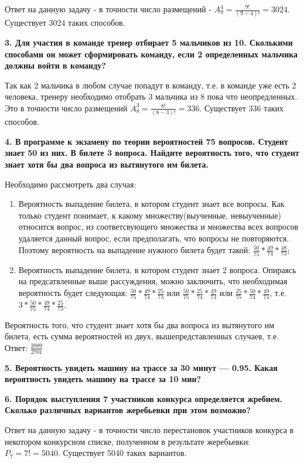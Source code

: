 \documentclass{article}
\begin{document}
Ответ на данную задачу - в точности число размещений - $A^{4}_{9} = \frac{9!}{(9 - 4)!} = 3024$.
Существует 3024 таких способов.

\textbf{3. Для участия в команде тренер отбирает 5 мальчиков из 10. Сколькими способами он может сформировать команду, если 2 определенных мальчика должны войти в команду?}

Так как 2 мальчика в любом случае попадут в команду, т.е. в команде уже есть 2 человека, тренеру необходимо отобрать 3 мальчика из 8 пока что неопредленных. Это  в точности число размещений $A^{3}_{8} = \frac{8!}{(8 - 3)!} = 336$.
Существует 336 таких способов.

\textbf{4. В программе к экзамену по теории вероятностей 75 вопросов. Студент знает 50 из них. В билете 3 вопроса. Найдите вероятность того, что студент знает хотя бы два вопроса из вытянутого им билета.}

Необходимо рассмотреть два случая:
\begin{enumerate}
\item Вероятность выпадение билета, в котором студент знает все вопросы. Как только студент понимает, к какому множеству(выученные, невыученные) относится вопрос, из соответсвующего множества и множества всех вопросов удаляется данный вопрос, если предполагать, что вопросы не повторяются. Поэтому вероятность на выпадение нужного билета будет такой: $\frac{50}{75}*\frac{49}{74}*\frac{48}{73}$;
\item Вероятность выпадение билета, в котором студент знает 2 вопроса. Опираясь на предсатвленные выше рассуждения, можно заключить, что необходимая вероятность будет следующая: $\frac{50}{75}*\frac{49}{74}*\frac{25}{73}$ или $\frac{50}{75}*\frac{25}{74}*\frac{49}{73}$ или $\frac{25}{75}*\frac{50}{74}*\frac{49}{73}$, т.е. $3*\frac{50}{75}*\frac{49}{74}*\frac{25}{73}$.
\end{enumerate}

Вероятность того, что студент знает хотя бы два вопроса из вытянутого им билета, есть сумма вероятностей из двух, вышепредставленных случаев, т.е.
Ответ: $\frac{2009}{2701}$

\textbf{5. Вероятность увидеть машину на трассе за 30 минут — 0.95. Какая вероятность увидеть машину на трассе за 10 мин? }

\textbf{6. Порядок выступления 7 участников конкурса определяется жребием. Сколько различных вариантов жеребьевки при этом возможно?}

Ответ на данную задачу - в точности число перестановок участников конкурса в некотором конкурсном списке, полученном в результате жеребьевки: $P_{7} = 7! = 5040$.
Существует 5040 таких вариантов.
\end{document}
